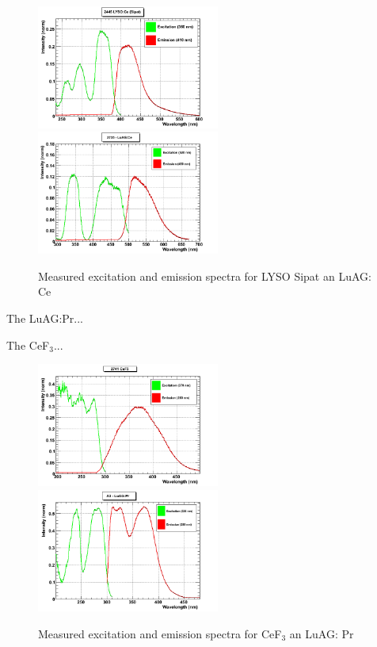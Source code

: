 \begin{figure}[htbp]
\begin{center}
\includegraphics[width=6cm]{../Pictures/Chapter_5/LYSO_Sipat.png}
\includegraphics[width=6cm]{../Pictures/Chapter_5/LuAG_ce.png}
\end{center}
\caption[Sipat - LuAG excitation/emission]{Measured excitation and emission spectra for LYSO Sipat an LuAG: Ce}
\label{fig:luag_lso}
\end{figure}

The LuAG:Pr...

The CeF$_{3}$...

\begin{figure}[htbp]
\begin{center}
\includegraphics[width=6cm]{../Pictures/Chapter_5/cef3.png}
\includegraphics[width=6cm]{../Pictures/Chapter_5/LuAG_pr.png}
\end{center}
\caption[CeF$_{3}$ - LuAG excitation/emission]{Measured excitation and emission spectra for CeF$_{3}$ an LuAG: Pr}
\label{fig:luag_cef3}
\end{figure}

